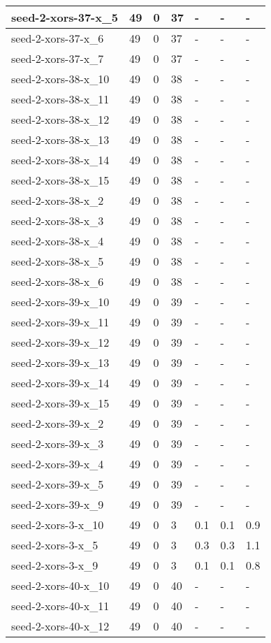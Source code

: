 \begin{scriptsize}
\begin{longtable}{|p{5cm}|l|l|l|l|l|l|}
seed-2-xors-37-x\_5&49&0&37&-&-&- \\ \hline 
seed-2-xors-37-x\_6&49&0&37&-&-&- \\ \hline 
seed-2-xors-37-x\_7&49&0&37&-&-&- \\ \hline 
seed-2-xors-38-x\_10&49&0&38&-&-&- \\ \hline 
seed-2-xors-38-x\_11&49&0&38&-&-&- \\ \hline 
seed-2-xors-38-x\_12&49&0&38&-&-&- \\ \hline 
seed-2-xors-38-x\_13&49&0&38&-&-&- \\ \hline 
seed-2-xors-38-x\_14&49&0&38&-&-&- \\ \hline 
seed-2-xors-38-x\_15&49&0&38&-&-&- \\ \hline 
seed-2-xors-38-x\_2&49&0&38&-&-&- \\ \hline 
seed-2-xors-38-x\_3&49&0&38&-&-&- \\ \hline 
seed-2-xors-38-x\_4&49&0&38&-&-&- \\ \hline 
seed-2-xors-38-x\_5&49&0&38&-&-&- \\ \hline 
seed-2-xors-38-x\_6&49&0&38&-&-&- \\ \hline 
seed-2-xors-39-x\_10&49&0&39&-&-&- \\ \hline 
seed-2-xors-39-x\_11&49&0&39&-&-&- \\ \hline 
seed-2-xors-39-x\_12&49&0&39&-&-&- \\ \hline 
seed-2-xors-39-x\_13&49&0&39&-&-&- \\ \hline 
seed-2-xors-39-x\_14&49&0&39&-&-&- \\ \hline 
seed-2-xors-39-x\_15&49&0&39&-&-&- \\ \hline 
seed-2-xors-39-x\_2&49&0&39&-&-&- \\ \hline 
seed-2-xors-39-x\_3&49&0&39&-&-&- \\ \hline 
seed-2-xors-39-x\_4&49&0&39&-&-&- \\ \hline 
seed-2-xors-39-x\_5&49&0&39&-&-&- \\ \hline 
seed-2-xors-39-x\_9&49&0&39&-&-&- \\ \hline 
seed-2-xors-3-x\_10&49&0&3&0.1&0.1&0.9 \\ \hline 
seed-2-xors-3-x\_5&49&0&3&0.3&0.3&1.1 \\ \hline 
seed-2-xors-3-x\_9&49&0&3&0.1&0.1&0.8 \\ \hline 
seed-2-xors-40-x\_10&49&0&40&-&-&- \\ \hline 
seed-2-xors-40-x\_11&49&0&40&-&-&- \\ \hline 
seed-2-xors-40-x\_12&49&0&40&-&-&- \\ \hline 

\end{longtable}
\end{scriptsize}
